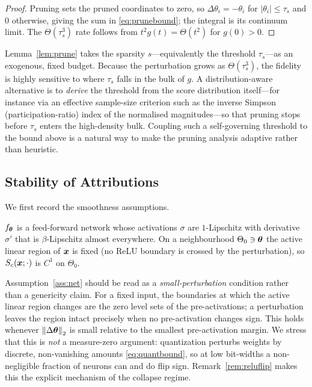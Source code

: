 \begin{proof}
Pruning sets the pruned coordinates to zero, so $\Delta\theta_i=-\theta_i$ for
$|\theta_i|\le\tau_s$ and $0$ otherwise, giving the sum in
\eqref{eq:prunebound}; the integral is its continuum limit. The $\Theta(\tau_s^3)$
rate follows from $t^2g(t)=\Theta(t^2)$ for $g(0)>0$.
\end{proof}

\begin{remark}
\label{rem:adaptive-prune}
Lemma~\ref{lem:prune} takes the sparsity $s$---equivalently the threshold
$\tau_s$---as an exogenous, fixed budget. Because the perturbation grows as
$\Theta(\tau_s^3)$, the fidelity is highly sensitive to where $\tau_s$ falls in
the bulk of $g$. A distribution-aware alternative is to \emph{derive} the
threshold from the score distribution itself---for instance via an effective
sample-size criterion such as the inverse Simpson (participation-ratio) index of
the normalised magnitudes---so that pruning stops before $\tau_s$ enters the
high-density bulk. Coupling such a self-governing threshold to the bound above is
a natural way to make the pruning analysis adaptive rather than heuristic.
\end{remark}

\subsection{Stability of Attributions}
We first record the smoothness assumptions.

\begin{assumption}
\label{ass:net}
$f_{\bm{\theta}}$ is a feed-forward network whose activations $\sigma$ are
$1$-Lipschitz with derivative $\sigma'$ that is $\beta$-Lipschitz almost
everywhere. On a neighbourhood $\Theta_0\ni\bm{\theta}$ the active linear region of
$\bm{x}$ is fixed (no ReLU boundary is crossed by the perturbation), so
$S_c(\bm{x};\cdot)$ is $C^1$ on $\Theta_0$.
\end{assumption}

Assumption~\ref{ass:net} should be read as a \emph{small-perturbation} condition
rather than a genericity claim. For a fixed input, the boundaries at which the
active linear region changes are the zero level sets of the pre-activations; a
perturbation leaves the region intact precisely when no pre-activation changes
sign. This holds whenever $\left\lVert\Delta\bm{\theta}\right\rVert_2$ is small relative to the
smallest pre-activation margin. We stress that this is \emph{not} a
measure-zero argument: quantization perturbs weights by discrete, non-vanishing
amounts \eqref{eq:quantbound}, so at low bit-widths a non-negligible fraction of
neurons can and do flip sign. Remark~\ref{rem:reluflip} makes this the explicit
mechanism of the collapse regime.

